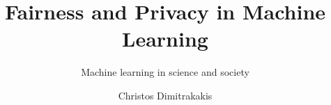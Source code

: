 \documentclass[9pt]{beamer}
\title{Fairness and Privacy in Machine Learning}
\subtitle{Machine learning in science and society}
\author[C. Dimitrakakis]{Christos Dimitrakakis}
\begin{document}
\begin{frame}
  \titlepage
\end{frame}





\end{document}
